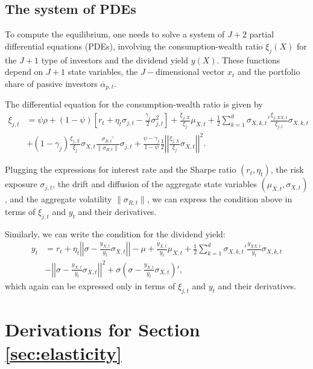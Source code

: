 \subsection{The system of PDEs}

To compute the equilibrium, one needs to solve a system of $J+2$ partial differential equations (PDEs), involving the consumption-wealth ratio $\xi_{j}(X)$ %
for the $J+1$ type of investors and the dividend yield $y(X)$. %
These functions depend on $J+1$ state variables, the $J-$dimensional vector $x_{t}$ and the portfolio share of passive investors $\overline{\alpha}_{p,t}$.

The differential equation for the consumption-wealth ratio is given by
\begin{align}
    \xi_{j,t} &= \psi \rho + (1-\psi) \left[ r_t + \eta_t \sigma_{j,t} - \frac{\gamma_j}{2} \sigma_{j,t}^2 \right] + \frac{\xi_{j,X}}{\xi_j} \mu_{X,t} + \frac{1}{2} \sum_{k=1}^d \sigma_{X,k,t}' \frac{\xi_{j,XX,t}}{\xi_{j,t}} \sigma_{X,k,t}\nonumber\\
    &+ (1-\gamma_j)  \frac{\xi_{j,X}}{\xi_j} \sigma_{X,t} \frac{\sigma_{R,t}'}{\|\sigma_{R,t}\|} \sigma_{j,t} + \frac{\psi - \gamma_j}{1-\psi} \frac{1}{2} \left|\left| \frac{\xi_{j,X}}{\xi_j} \sigma_{X,t}\right|\right|^2.
\end{align}

Plugging the expressions for interest rate and the Sharpe ratio $(r_t, \eta_t)$, the risk exposure $\sigma_{j,t}$, the drift and diffusion of the aggregate state variables $(\mu_{X,t}, \sigma_{X,t})$, and the aggregate volatility $\|\sigma_{R,t}\|$, we can express the condition above in terms of $\xi_{j,t}$ and $y_t$ and their derivatives. 

Similarly, we can write the condition for the dividend yield:
\begin{align}
    y_t &= r_t + \eta_t \left|\left|\sigma - \frac{y_{X,t}}{y_t} \sigma_{X,t}\right|\right| -\mu + \frac{y_{X,t}}{y_t} \mu_{X,t} + \frac{1}{2} \sum_{k=1}^d \sigma_{X,k,t}' \frac{y_{XX,t}}{y_{t}} \sigma_{X,k,t}\nonumber\\
    &
    - \left|\left|\sigma - \frac{y_{X,t}}{y_t} \sigma_{X,t}\right|\right|^2+ \sigma \left(\sigma - \frac{y_{X,t}}{y_t} \sigma_{X,t} \right)',
\end{align}
which again can be expressed only in terms of $\xi_{j,t}$ and $y_t$ and their derivatives. 

\section{Derivations for Section \ref{sec:elasticity}}

